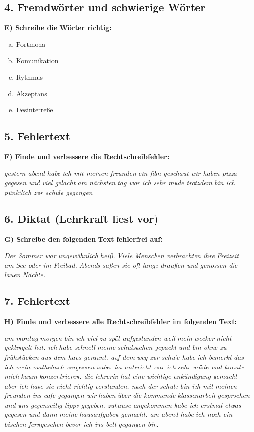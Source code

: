 \subsection*{4. Fremdwörter und schwierige Wörter}
\textbf{E) Schreibe die Wörter richtig:}
\begin{enumerate}[a)]
    \item Portmonä
    \item Komunikation
    \item Rythmus
    \item Akzeptans
    \item Desinterreße
\end{enumerate}

\subsection*{5. Fehlertext}
\textbf{F) Finde und verbessere die Rechtschreibfehler:}

\textit{gestern abend habe ich mit meinen freunden ein film geschaut wir haben pizza gegesen und viel gelacht am nächsten tag war ich sehr müde trotzdem bin ich pünktlich zur schule gegangen}

\subsection*{6. Diktat (Lehrkraft liest vor)}
\textbf{G) Schreibe den folgenden Text fehlerfrei auf:}

\textit{Der Sommer war ungewöhnlich heiß. Viele Menschen verbrachten ihre Freizeit am See oder im Freibad. Abends saßen sie oft lange draußen und genossen die lauen Nächte.}

\subsection*{7. Fehlertext}
\textbf{H) Finde und verbessere alle Rechtschreibfehler im folgenden Text:}

\textit{am montag morgen bin ich viel zu spät aufgestanden weil mein wecker nicht geklingelt hat. ich habe schnell meine schulsachen gepackt und bin ohne zu frühstücken aus dem haus gerannt. auf dem weg zur schule habe ich bemerkt das ich mein mathebuch vergessen habe. im untericht war ich sehr müde und konnte mich kaum konzentrieren. die lehrerin hat eine wichtige ankündigung gemacht aber ich habe sie nicht richtig verstanden. nach der schule bin ich mit meinen freunden ins cafe gegangen wir haben über die kommende klassenarbeit gesprochen und uns gegenseitig tipps gegeben. zuhause angekommen habe ich erstmal etwas gegesen und dann meine hausaufgaben gemacht. am abend habe ich noch ein bischen ferngesehen bevor ich ins bett gegangen bin.}
